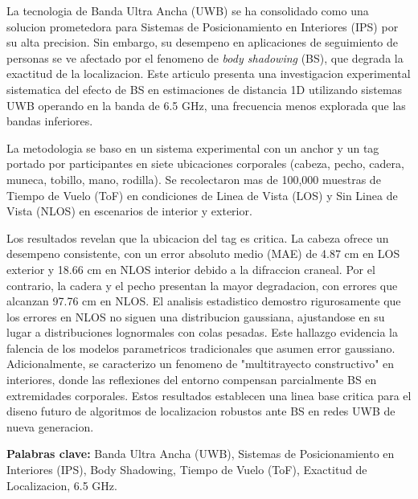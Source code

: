 La tecnologia de Banda Ultra Ancha (UWB) se ha consolidado como una solucion prometedora para Sistemas de Posicionamiento en Interiores (IPS) por su alta precision. Sin embargo, su desempeno en aplicaciones de seguimiento de personas se ve afectado por el fenomeno de \textit{body shadowing} (BS), que degrada la exactitud de la localizacion. Este articulo presenta una investigacion experimental sistematica del efecto de BS en estimaciones de distancia 1D utilizando sistemas UWB operando en la banda de 6.5 GHz, una frecuencia menos explorada que las bandas inferiores.

La metodologia se baso en un sistema experimental con un anchor y un tag portado por participantes en siete ubicaciones corporales (cabeza, pecho, cadera, muneca, tobillo, mano, rodilla). Se recolectaron mas de 100,000 muestras de Tiempo de Vuelo (ToF) en condiciones de Linea de Vista (LOS) y Sin Linea de Vista (NLOS) en escenarios de interior y exterior.

Los resultados revelan que la ubicacion del tag es critica. La cabeza ofrece un desempeno consistente, con un error absoluto medio (MAE) de 4.87 cm en LOS exterior y 18.66 cm en NLOS interior debido a la difraccion craneal. Por el contrario, la cadera y el pecho presentan la mayor degradacion, con errores que alcanzan 97.76 cm en NLOS. El analisis estadistico demostro rigurosamente que los errores en NLOS no siguen una distribucion gaussiana, ajustandose en su lugar a distribuciones lognormales con colas pesadas. Este hallazgo evidencia la falencia de los modelos parametricos tradicionales que asumen error gaussiano. Adicionalmente, se caracterizo un fenomeno de "multitrayecto constructivo" en interiores, donde las reflexiones del entorno compensan parcialmente BS en extremidades corporales. Estos resultados establecen una linea base critica para el diseno futuro de algoritmos de localizacion robustos ante BS en redes UWB de nueva generacion.

\textbf{Palabras clave:} Banda Ultra Ancha (UWB), Sistemas de Posicionamiento en Interiores (IPS), Body Shadowing, Tiempo de Vuelo (ToF), Exactitud de Localizacion, 6.5 GHz.

